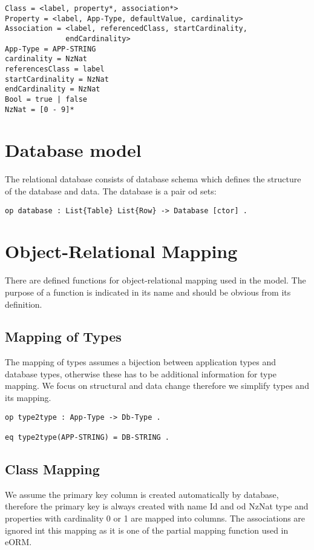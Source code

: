 \documentclass[11pt]{article}
\begin{document}
\begin{verbatim}
Class = <label, property*, association*>
Property = <label, App-Type, defaultValue, cardinality>
Association = <label, referencedClass, startCardinality, 
              endCardinality>
App-Type = APP-STRING 
cardinality = NzNat
referencesClass = label
startCardinality = NzNat
endCardinality = NzNat
Bool = true | false
NzNat = [0 - 9]*
\end{verbatim}

\section{Database model}
The relational database consists of database schema which defines the structure of the database and data. The database is a pair od sets:
\begin{verbatim}
op database : List{Table} List{Row} -> Database [ctor] .
\end{verbatim}



\newpage
\appendix
\section{Object-Relational Mapping}
There are defined functions for object-relational mapping used in the model. The purpose of a function is indicated in its name and should be obvious from its definition.

\subsection{Mapping of Types}
The mapping of types assumes a bijection between application types and database types, otherwise these has to be additional information for type mapping. We focus on structural and data change therefore we simplify types and its mapping.
\begin{verbatim}
op type2type : App-Type -> Db-Type .

eq type2type(APP-STRING) = DB-STRING .
\end{verbatim}

\subsection{Class Mapping}
We assume the primary key column is created automatically by database, therefore the primary key is always created with name Id and od NzNat type and properties with cardinality 0 or 1 are mapped into columns. The associations are ignored int this mapping as it is one of the partial mapping function used in eORM.
\end{document}
